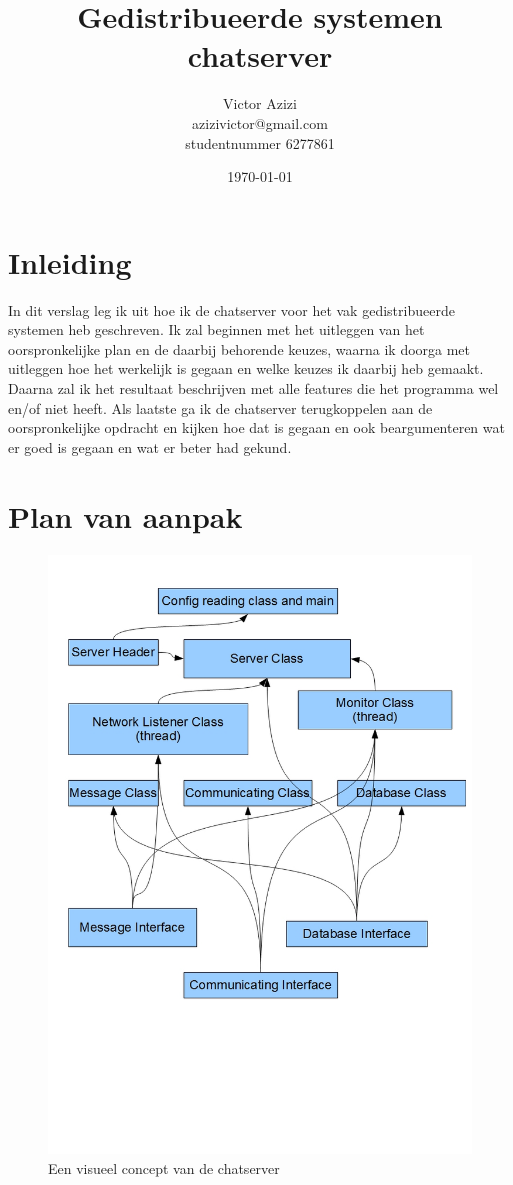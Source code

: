 \documentclass{article}
\title{Gedistribueerde systemen chatserver}
\author{Victor Azizi \\ azizivictor@gmail.com \\ studentnummer 6277861}
\date{\today}
\begin{document}
\section{Inleiding}
In dit verslag leg ik uit hoe ik de chatserver voor het vak gedistribueerde systemen heb geschreven. Ik zal beginnen met het uitleggen van het oorspronkelijke plan en de daarbij behorende keuzes, waarna ik doorga met uitleggen hoe het werkelijk is gegaan en welke keuzes ik daarbij heb gemaakt. Daarna zal ik het resultaat beschrijven met alle features die het programma wel en/of niet heeft. Als laatste ga ik de chatserver terugkoppelen aan de oorspronkelijke opdracht en kijken hoe dat is gegaan en ook beargumenteren wat er goed is gegaan en wat er beter had gekund.
\section{Plan van aanpak}
\begin{figure}[htb]
\includegraphics[trim = 0mm 100mm 0mm 0mm, scale=0.3]{doc/Flowchart.jpg}
\caption{Een visueel concept van de chatserver} 
\end{figure}
\end{document}
